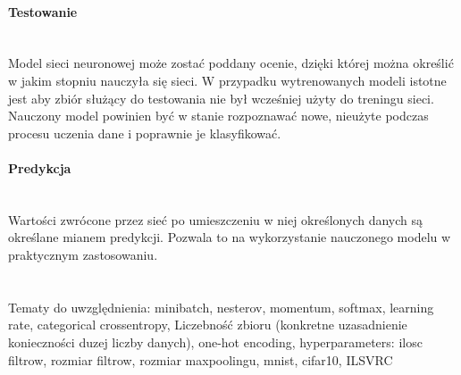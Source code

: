 \paragraph{Testowanie} \mbox{}\\
Model sieci neuronowej może zostać poddany ocenie, dzięki której można określić w jakim stopniu
nauczyła się sieci. W przypadku wytrenowanych modeli istotne jest aby zbiór służący do
testowania nie był wcześniej użyty do treningu sieci. Nauczony model powinien być w stanie
rozpoznawać nowe, nieużyte podczas procesu uczenia dane i poprawnie je klasyfikować.

\paragraph{Predykcja} \mbox{}\\
Wartości zwrócone przez sieć po umieszczeniu w niej określonych danych są określane
mianem predykcji. Pozwala to na wykorzystanie nauczonego modelu w praktycznym
zastosowaniu. \\ \\ \\

Tematy do uwzględnienia:
minibatch,
nesterov,
momentum,
softmax,
learning rate,
categorical crossentropy,
Liczebność zbioru (konkretne uzasadnienie konieczności duzej liczby danych),
one-hot encoding,
hyperparameters: ilosc filtrow, rozmiar filtrow, rozmiar maxpoolingu,
mnist, cifar10, ILSVRC
